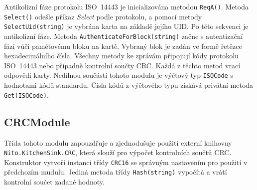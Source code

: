 Antikolizní fáze protokolu ISO~14443 je inicializována metodou \verb|ReqA()|. Metoda \verb|Select()| odešle příkaz \emph{Select} podle protokolu, a pomocí metody \verb|SelectUid(string)| je vybrána karta na základě jejího UID. Po této sekvenci je antikolizní fáze. Metoda \verb|AuthenticateForBlock(string)| začne s autentizační fází vůči paměťovému bloku na kartě. Vybraný blok je zadán ve formě řetězce hexadecimálního čísla. Všechny metody ke zprávám připojují kódy protokolu ISO~14443 nebo případně kontrolní součty CRC. Každá z těchto metod vrací odpovědi karty. Nedílnou součástí tohoto modulu je výčtový typ \verb|ISOCode| s hodnotami kódů standardu. Čísla kódů z výčtového typu získává privátní metoda \verb|Get(ISOCode)|.

\subsection*{CRCModule}
Třída tohoto modulu zapouzdřuje a zjednodušuje použití externí knihovny \verb|Nito.KitchenSink.CRC|\footnotemark, která slouží pro výpočet kontrolních součtů CRC. Konstruktor vytvoří instanci třídy \verb|CRC16| se správným nastavením pro použití v předchozím mudulu. Jediná metoda třídy \verb|Hash(string)| vypočítá a vrátí kontrolní součet zadané hodnoty. 


